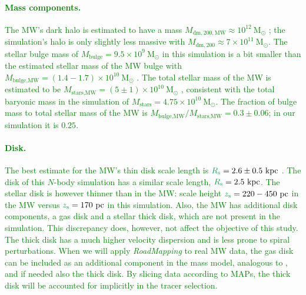 \documentclass[iop,revtex4,numberedappendix,appendixfloats]{emulateapj}
\newcommand{\RM}{{\sl RoadMapping}}
\newcommand{\NEW}[1]{\textcolor{Green}{#1}}
\newcommand{\OLD}[1]{}
\begin{document}
\NEW{\paragraph{Mass components.} The MW's dark halo is estimated to have a mass $M_{\text{dm},200,\text{MW}}\approx10^{12}~\text{M}_\odot$ \citep{2016ARA&A..54..529B}; the simulation's halo is only slightly less massive with $M_{\text{dm},200}\approx7\times 10^{11}~\text{M}_\odot$. The stellar bulge mass of $M_\text{bulge}=9.5\times 10^9~\text{M}_\odot$ in this simulation is a bit smaller than the estimated stellar mass of the MW bulge with $M_\text{bulge,MW} = (1.4-1.7) \times 10^{10}~\text{M}_\odot$ \citep{2015MNRAS.448..713P}. The total stellar mass of the MW is estimated to be $M_\text{stars,MW} =(5\pm1)\times 10^{10}~  \text{M}_\odot$ \citep{2016ARA&A..54..529B}, consistent with the total baryonic mass in the simulation of $M_\text{stars}=4.75\times 10^{10}~  \text{M}_\odot$. The fraction of bulge mass to total stellar mass of the MW is $M_\text{bulge,MW}/M_\text{stars,MW}= 0.3\pm0.06$; in our simulation it is $0.25$.}

\NEW{\paragraph{Disk.} The best estimate for the MW's thin disk scale length is $\OLD{h_r}\NEW{R_\text{s}} = 2.6 \pm 0.5~\text{kpc}$ \citep{2016ARA&A..54..529B}. The disk of this $N$-body simulation has a similar scale length, $\OLD{h_r}\NEW{R_\text{s}} = 2.5~\text{kpc}$. The stellar disk is however thinner than in the MW: scale height $\OLD{h_z}\NEW{z_\text{s}}=220-450~\text{pc}$ in the MW \citep{2016ARA&A..54..529B} versus $\OLD{h_z}\NEW{z_\text{s}}=170~\text{pc}$ in this simulation. Also, the MW has additional disk components, a gas disk and a stellar thick disk, which are not present in the simulation. This discrepancy does, however, not affect the objective of this study. The thick disk has a much higher velocity dispersion and is less prone to spiral perturbations. When we will apply \RM{} to real MW data, the gas disk can be included as an additional component in the mass model, analogous to \citet{2013ApJ...779..115B}, and if needed also the thick disk. By slicing data according to MAPs, the thick disk will be accounted for implicitly in the tracer selection.}
\end{document}
